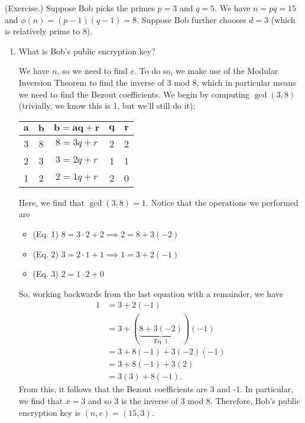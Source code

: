 \documentclass[letterpaper]{article}
\begin{document}
\begin{mdframed}
    (Exercise.) Suppose Bob picks the primes $p = 3$ and $q = 5$. We have $n = pq = 15$ and $\phi(n) = (p - 1)(q - 1) = 8$. Suppose Bob further chooses $d = 3$ (which is relatively prime to 8). 

    \begin{enumerate}
        \item What is Bob's public encryption key? 
        \begin{mdframed}
            We have $n$, so we need to find $e$. To do so, we make use of the Modular Inversion Theorem to find the inverse of $3$ mod $8$, which in particular means we need to find the Bezout coefficients. We begin by computing $\gcd(3, 8)$ (trivially, we know this is 1, but we'll still do it);
            \begin{center}
                \begin{tabular}{|c|c|c|c|c|}
                    \hline 
                    $\mathbf{a}$ & $\mathbf{b}$ & $\mathbf{b = aq + r}$ & $\mathbf{q}$ & $\mathbf{r}$ \\ 
                    \hline 
                    3 & 8 & $8 = 3q + r$ & 2 & 2 \\
                    2 & 3 & $3 = 2q + r$ & 1 & 1 \\ 
                    1 & 2 & $2 = 1q + r$ & 2 & 0 \\ 
                    \hline 
                \end{tabular}
            \end{center}
            Here, we find that $\gcd(3, 8) = 1$. Notice that the operations we performed are 
            \begin{itemize}
                \item (Eq. 1) $8 = 3 \cdot 2 + 2 \implies 2 = 8 + 3 (-2)$
                \item (Eq. 2) $3 = 2 \cdot 1 + 1 \implies 1 = 3 + 2 (-1)$ 
                \item (Eq. 3) $2 = 1 \cdot 2 + 0$
            \end{itemize}
            So, working backwards from the last equation with a remainder, we have 
            \begin{equation*}
                \begin{aligned}
                    1 &= 3 + 2 (-1) \\ 
                        &= 3 + (\underbrace{8 + 3(-2)}_{\text{Eq. 1}}) (-1) \\ 
                        &= 3 + 8(-1) + 3 (-2)(-1) \\ 
                        &= 3 + 8(-1) + 3(2) \\ 
                        &= 3(3) + 8(-1).
                \end{aligned}
            \end{equation*}
            From this, it follows that the Bezout coefficients are 3 and -1. In particular, we find that $x = 3$ and so 3 is the inverse of 3 mod 8. Therefore, Bob's public encryption key is $(n, e) = \boxed{(15, 3)}$. 
        \end{mdframed}


\end{enumerate}
\end{mdframed}
\end{document}
